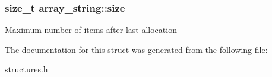 \subsubsection[{\texorpdfstring{size}{size}}]{\setlength{\rightskip}{0pt plus 5cm}size\+\_\+t array\+\_\+string\+::size}\hypertarget{structarray__string_a60c13969c1fb29949906ea61bb306b37}{}\label{structarray__string_a60c13969c1fb29949906ea61bb306b37}
Maximum number of items after last allocation 

The documentation for this struct was generated from the following file\+:\begin{DoxyCompactItemize}
\item 
structures.\+h\end{DoxyCompactItemize}
